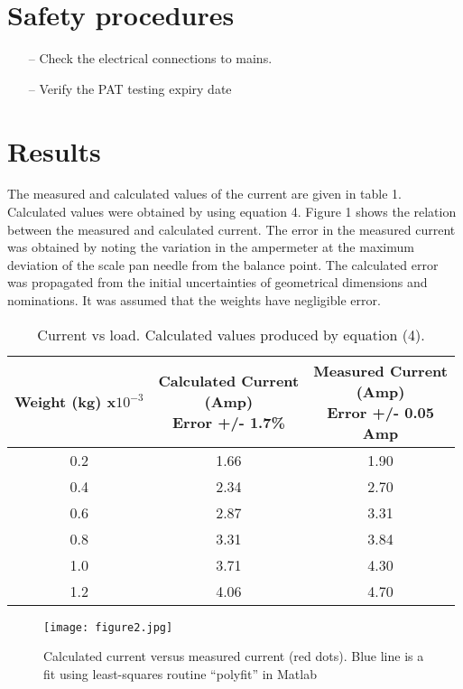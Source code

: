\documentclass[twocolumn]{article}
\begin{document}
\section{Safety procedures}
\begin{itemize}
\setlength{\itemsep}{1pt}
\setlength{\parskip}{0pt}
\setlength{\parsep}{0pt}
\item[--] Check the electrical connections to mains.
\item[--] Verify the PAT testing expiry date
\end{itemize}

\section{Results}
The measured and calculated values of the current are given in table 1. Calculated values were
obtained by using equation 4. Figure 1 shows the relation between the measured and calculated
current. The error in the measured current was obtained by noting the variation in the
ampermeter at the maximum deviation of the scale pan needle from the balance point. The
calculated error was propagated from the initial uncertainties of geometrical dimensions and
nominations. It was assumed that the weights have negligible error. 
\begin{table}[H]
\centering
\caption{Current vs load. Calculated values produced by equation (4).}
\label{tab:table}
\begin{tabular}{c c c}
\hline
\makecell{Weight \\(kg) \\ x$10^{-3}$} & \makecell{Calculated Current \\ (Amp) \\ Error +/- 1.7\%} & \makecell{Measured Current \\ (Amp) \\ Error +/- 0.05 \\ Amp} \\
\hline
0.2 & 1.66 & 1.90\\
0.4 & 2.34 & 2.70\\
0.6 & 2.87 & 3.31\\
0.8 & 3.31 & 3.84\\
1.0 & 3.71 & 4.30\\
1.2 & 4.06 & 4.70\\
\hline
\end{tabular}
\end{table}
\begin{figure}[H]
\centering
\texttt{[image: figure2.jpg]}
\caption{Calculated current versus measured current (red dots). Blue line is a fit
using least-squares routine “polyfit” in Matlab}
 \label{fig:figure2}
\end{figure}
\end{document}
